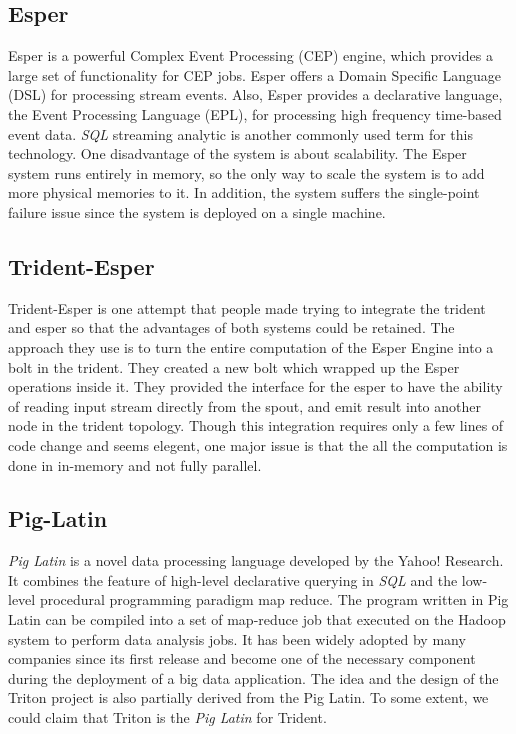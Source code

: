 \documentclass[conference, twocolumn, 11pt]{IEEEtran}
\theoremstyle{definition}
\begin{document}
\subsection{Esper}
Esper is a powerful Complex Event Processing (CEP) engine, which provides a large set of functionality for CEP jobs. Esper offers a Domain Specific Language (DSL) for processing stream events.
Also, Esper provides a declarative language, the Event Processing Language (EPL), for processing high frequency time-based event data. \emph{SQL} streaming analytic is another commonly used term for this
technology. One disadvantage of the system is about scalability. The Esper system runs entirely in memory, so the only way to scale the system is to add more physical memories to it. In addition,
the system suffers the single-point failure issue since the system is deployed on a single machine.

\subsection{Trident-Esper}
Trident-Esper is one attempt that people made trying to integrate the trident and esper so that the advantages of both systems could be retained. The approach they use is to turn the entire
computation of the Esper Engine into a bolt in the trident. They created a new bolt which wrapped up the Esper operations inside it. They provided the interface for the esper to have the
ability of reading input stream directly from the spout, and emit result into another node in the trident topology. Though this integration requires only a few lines of code change and seems
elegent, one major issue is that the all the computation is done in in-memory and not fully parallel.

\subsection{Pig-Latin}
\emph{Pig Latin} is a novel data processing language developed by the Yahoo! Research. It combines the feature of high-level declarative querying in \emph{SQL} and the low-level procedural programming
paradigm map reduce. The program written in Pig Latin can be compiled into a set of map-reduce job that executed on the Hadoop system to perform data analysis jobs. It has been widely adopted by
many companies since its first release and become one of the necessary component during the deployment of a big data application. The idea and the design of the Triton project is also partially derived
from the Pig Latin. To some extent, we could claim that Triton is the \emph{Pig Latin} for Trident.
\end{document}
